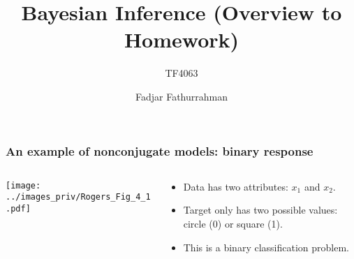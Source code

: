 \documentclass[english,10pt,aspectratio=169,fleqn]{beamer}
\begin{document}
\title{Bayesian Inference (Overview to Homework)}
\subtitle{TF4063}
\author{Fadjar Fathurrahman}
\date{}


\frame{\titlepage}


\begin{frame} %
\frametitle{An example of nonconjugate models: binary response}

\begin{columns}

\begin{column}{0.5\textwidth}
{\centering
\texttt{[image: ../images\_priv/Rogers\_Fig\_4\_1.pdf]}
\par}
\end{column}

\begin{column}{0.5\textwidth}
\begin{itemize}
\item Data has two attributes: $x_1$ and $x_2$.
\item Target only has two possible values: circle (0) or square (1).
\item This is a binary classification problem.
\end{itemize}
\end{column}

\end{columns}

\end{frame} %
\end{document}
